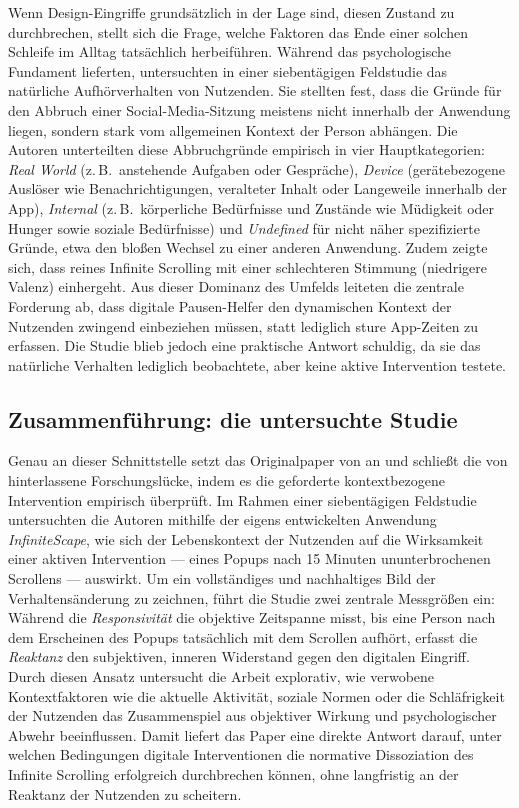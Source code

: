 \documentclass[11pt,a4paper]{article}
\begin{document}
Wenn Design-Eingriffe grundsätzlich in der Lage sind, diesen Zustand zu durchbrechen, stellt
sich die Frage, welche Faktoren das Ende einer solchen Schleife im Alltag tatsächlich
herbeiführen. Während \citet{baughan2022dissociation} das psychologische Fundament
lieferten, untersuchten \citet{rixen2023loop} in einer siebentägigen Feldstudie das natürliche
Aufhörverhalten von Nutzenden. Sie stellten fest, dass die Gründe für den Abbruch einer
Social-Media-Sitzung meistens nicht innerhalb der Anwendung liegen, sondern stark vom
allgemeinen Kontext der Person abhängen. Die Autoren unterteilten diese Abbruchgründe
empirisch in vier Hauptkategorien: \emph{Real World} (z.\,B.\ anstehende Aufgaben oder
Gespräche), \emph{Device} (gerätebezogene Auslöser wie Benachrichtigungen, veralteter Inhalt
oder Langeweile innerhalb der App), \emph{Internal} (z.\,B.\ körperliche Bedürfnisse und
Zustände wie Müdigkeit oder Hunger sowie soziale Bedürfnisse) und \emph{Undefined} für nicht
näher spezifizierte Gründe, etwa den bloßen Wechsel zu einer anderen Anwendung. Zudem zeigte
sich, dass reines Infinite Scrolling mit einer schlechteren Stimmung
(niedrigere Valenz) einhergeht. Aus dieser Dominanz des Umfelds leiteten
\citet{rixen2023loop} die zentrale Forderung ab, dass digitale Pausen-Helfer den dynamischen
Kontext der Nutzenden zwingend einbeziehen müssen, statt lediglich sture App-Zeiten zu
erfassen. Die Studie blieb jedoch eine praktische Antwort schuldig, da sie das natürliche
Verhalten lediglich beobachtete, aber keine aktive Intervention testete.

\subsection{Zusammenführung: die untersuchte Studie}

Genau an dieser Schnittstelle setzt das Originalpaper von \citet{meinhardt2025scrolling} an
und schließt die von \citet{rixen2023loop} hinterlassene Forschungslücke, indem es die
geforderte kontextbezogene Intervention empirisch überprüft. Im Rahmen einer siebentägigen
Feldstudie untersuchten die Autoren mithilfe der eigens entwickelten Anwendung
\emph{InfiniteScape}, wie sich der Lebenskontext der Nutzenden auf die Wirksamkeit einer
aktiven Intervention --- eines Popups nach 15 Minuten ununterbrochenen Scrollens ---
auswirkt. Um ein vollständiges und nachhaltiges Bild der Verhaltensänderung zu zeichnen,
führt die Studie zwei zentrale Messgrößen ein: Während die \emph{Responsivität} die
objektive Zeitspanne misst, bis eine Person nach dem Erscheinen des Popups tatsächlich mit
dem Scrollen aufhört, erfasst die \emph{Reaktanz} den subjektiven, inneren Widerstand gegen
den digitalen Eingriff. Durch diesen Ansatz untersucht die Arbeit explorativ, wie verwobene
Kontextfaktoren wie die aktuelle Aktivität, soziale Normen oder die Schläfrigkeit der
Nutzenden das Zusammenspiel aus objektiver Wirkung und psychologischer Abwehr beeinflussen.
Damit liefert das Paper eine direkte Antwort darauf, unter welchen Bedingungen digitale
Interventionen die normative Dissoziation des Infinite Scrolling erfolgreich durchbrechen
können, ohne langfristig an der Reaktanz der Nutzenden zu scheitern.
\end{document}
